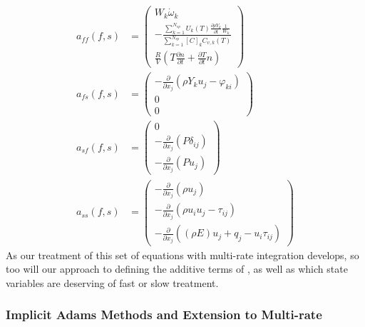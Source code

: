 \begin{align*}
a_{ff}(f,s) &= \left(\begin{array}{c} W_{k}\dot{\omega}_{k} \\[0.3cm]
	       - \frac{\sum_{k=1}^{N_{sp}}U_{k}(T)\frac{\partial \rho Y_{k}}{\partial t}\frac{1}{W_{k}}}{\sum_{k=1}^{N_{sp}}[C]_{k}C_{v,k}(T)} \\[0.5cm]
	       \frac{R}{V}(T\frac{\partial n}{\partial t} + \frac{\partial T}{\partial t}n) \end{array} \right) \\
a_{fs}(f,s) &= \left(\begin{array}{c} -\frac{\partial}{\partial x_{j}}(\rho Y_{k} u_{j} - \varphi_{ki}) \\
	                              0 \\
                                      0 \end{array} \right) \\
a_{sf}(f,s) &= \left(\begin{array}{c} 0 \\
                                      -\frac{\partial}{\partial x_{j}}(P\delta_{ij}) \\
                                      -\frac{\partial}{\partial x_{j}}(Pu_{j}) \end{array} \right) \\
a_{ss}(f,s) &= \left(\begin{array}{c} -\frac{\partial}{\partial x_{j}}(\rho u_{j}) \\
                                      -\frac{\partial}{\partial x_{j}}(\rho u_{i} u_{j} - \tau_{ij}) \\
                                      -\frac{\partial}{\partial x_{j}}((\rho E)u_{j} + q_{j} - u_{i}\tau_{ij}) \end{array} \right)
\end{align*}
As our treatment of this set of equations with multi-rate integration develops,
so too will our approach to defining the additive terms of ,
as well as which state variables are deserving of fast or slow treatment.

\subsubsection{Implicit Adams Methods and Extension to Multi-rate}

